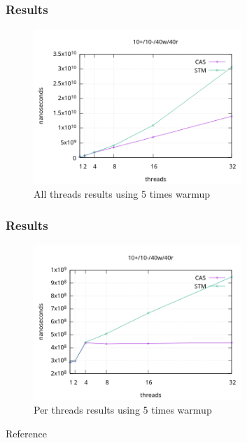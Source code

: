 \documentclass{beamer}
\begin{document}
\begin{frame}
    \frametitle{Results}
    \begin{figure}
        \centering
        \includegraphics[width=0.7\textwidth]{results1.png}
        \caption{All threads results using 5 times warmup}
        \label{fig:res1}
    \end{figure}
\end{frame}

\begin{frame}
    \frametitle{Results}
    \begin{figure}
        \centering
        \includegraphics[width=0.7\textwidth]{results2.png}
        \caption{Per threads results using 5 times warmup}
        \label{fig:res2}
    \end{figure}
\end{frame}

\begin{frame}{Reference}

 
\end{frame}
\end{document}
